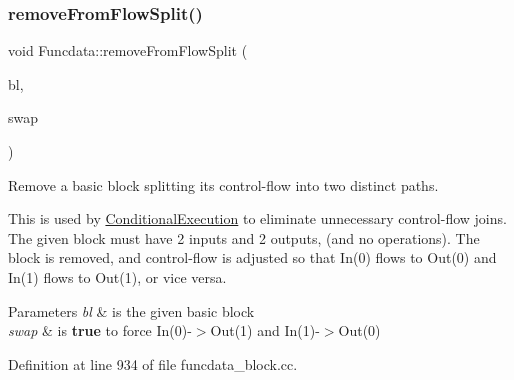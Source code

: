 \subsubsection{\texorpdfstring{removeFromFlowSplit()}{removeFromFlowSplit()}}
{\footnotesize\ttfamily void Funcdata\+::remove\+From\+Flow\+Split (\begin{DoxyParamCaption}\item[{\mbox{\hyperlink{class_block_basic}{Block\+Basic}} $\ast$}]{bl,  }\item[{bool}]{swap }\end{DoxyParamCaption})}



Remove a basic block splitting its control-\/flow into two distinct paths. 

This is used by \mbox{\hyperlink{class_conditional_execution}{Conditional\+Execution}} to eliminate unnecessary control-\/flow joins. The given block must have 2 inputs and 2 outputs, (and no operations). The block is removed, and control-\/flow is adjusted so that In(0) flows to Out(0) and In(1) flows to Out(1), or vice versa. 
\begin{DoxyParams}{Parameters}
{\em bl} & is the given basic block \\
\hline
{\em swap} & is {\bfseries{true}} to force In(0)-\/$>$Out(1) and In(1)-\/$>$Out(0) \\
\hline
\end{DoxyParams}


Definition at line 934 of file funcdata\+\_\+block.\+cc.

